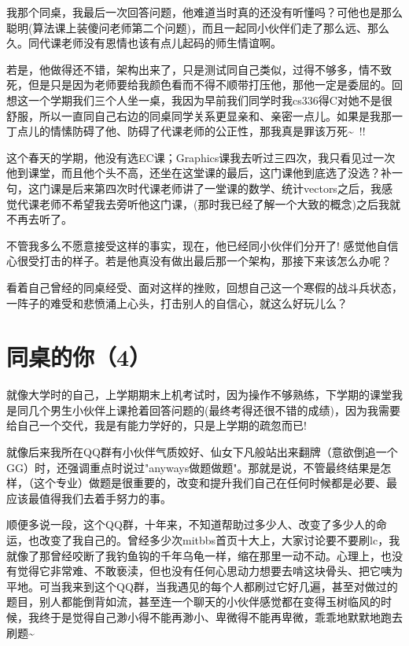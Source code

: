 \documentclass[12pt]{book}
\begin{document}
我那个同桌，我最后一次回答问题，他难道当时真的还没有听懂吗？可他也是那么聪明(算法课上装傻问老师第二个问题)，而且一起同小伙伴们走了那么远、那么久。同代课老师没有恩情也该有点儿起码的师生情谊啊。

若是，他做得还不错，架构出来了，只是测试同自己类似，过得不够多，情不致死，但是只是因为老师要给我颜色看而不得不顺带打压他，那他一定是委屈的。回想这一个学期我们三个人坐一桌，我因为早前我们同学时我cs336得C对她不是很舒服，所以一直同自己右边的同桌同学关系更显亲和、亲密一点儿。如果是我那一丁点儿的情愫防碍了他、防碍了代课老师的公正性，那我真是罪该万死\textasciitilde{}~!!

这个春天的学期，他没有选EC课；Graphics课我去听过三四次，我只看见过一次他到课堂，而且他个头不高，还坐在这堂课的最后，这门课他到底选了没选？补一句，这门课是后来第四次时代课老师讲了一堂课的数学、统计vectors之后，我感觉代课老师不希望我去旁听他这门课，(那时我已经了解一个大致的概念)之后我就不再去听了。

不管我多么不愿意接受这样的事实，现在，他已经同小伙伴们分开了! 感觉他自信心很受打击的样子。若是他真没有做出最后那一个架构，那接下来该怎么办呢？

看着自己曾经的同桌经受、面对这样的挫败，回想自己这一个寒假的战斗兵状态，一阵子的难受和悲愤涌上心头，打击别人的自信心，就这么好玩儿么？

\section{同桌的你（4）}
\label{sec-23-4}

就像大学时的自己，上学期期末上机考试时，因为操作不够熟练，下学期的课堂我是同几个男生小伙伴上课抢着回答问题的(最终考得还很不错的成绩)，因为我需要给自己一个交代，我是有能力学好的，只是上学期的疏忽而已!

就像后来我所在QQ群有小伙伴气质姣好、仙女下凡般站出来翻牌（意欲倒追一个GG）时，还强调重点时说过"anyways做题做题"。那就是说，不管最终结果是怎样，（这个专业）做题是很重要的，改变和提升我们自己在任何时候都是必要、最应该最值得我们去着手努力的事。

顺便多说一段，这个QQ群，十年来，不知道帮助过多少人、改变了多少人的命运，也改变了我自己的。曾经多少次mitbbs首页十大上，大家讨论要不要刷lc，我就像了那曾经咬断了我钓鱼钩的千年乌龟一样，缩在那里一动不动。心理上，也没有觉得它非常难、不敢亵渎，但也没有任何心思动力想要去啃这块骨头、把它咦为平地。可当我来到这个QQ群，当我遇见的每个人都刷过它好几遍，甚至对做过的题目，别人都能倒背如流，甚至连一个聊天的小伙伴感觉都在变得玉树临风的时候，我终于是觉得自己渺小得不能再渺小、卑微得不能再卑微，乖乖地默默地跑去刷题\textasciitilde{}~
\end{document}
